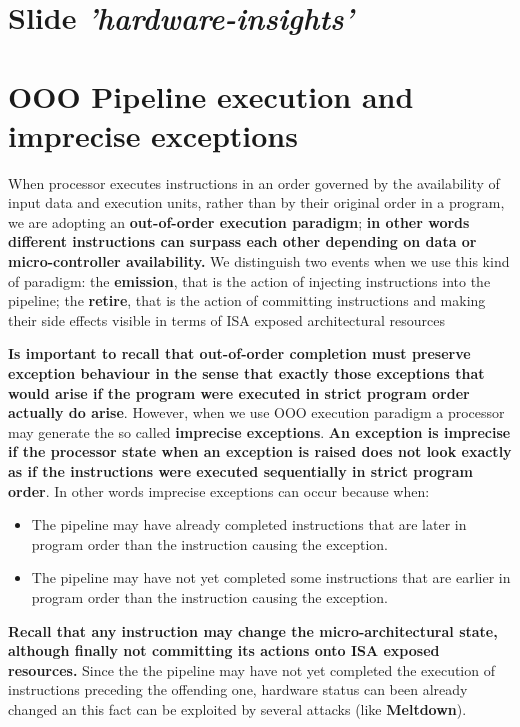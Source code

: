 \documentclass[10pt,a4paper]{article}
\begin{document}
\section{Slide \textit{'hardware-insights'}}

\section{OOO Pipeline execution and imprecise exceptions}

When processor executes instructions in an order governed by the availability of input data and execution units, rather than by their original order in a program, we are adopting an \textbf{out-of-order execution paradigm}; \textbf{in other words different instructions can surpass each other depending on data or micro-controller availability.} We distinguish two events when we use this kind of paradigm: the \textbf{emission}, that is the action of injecting instructions into the pipeline; the \textbf{retire}, that is the action of committing instructions and making their side effects visible in terms of ISA exposed architectural resources

\textbf{Is important to recall that out-of-order completion must preserve exception behaviour in the sense that exactly those exceptions that would arise if the program were executed in strict program order actually do arise}. However, when we use OOO execution paradigm a processor may generate the so called \textbf{imprecise exceptions}. \textbf{An exception is imprecise if the processor state  when  an  exception  is  raised  does  not  look  exactly  as  if  the instructions were executed sequentially in strict program order}. In other words imprecise exceptions can occur because when:

\begin{itemize}
\item The pipeline may have already completed instructions that are later in program order than the instruction causing the exception.
\item The pipeline may have not yet completed some instructions that are earlier in program order than the instruction causing the exception.
\end{itemize}

\textbf{Recall that any instruction may change the micro-architectural state, although finally not committing its actions onto ISA exposed resources.} Since the the pipeline may have not yet completed the execution of instructions preceding the offending one, hardware status can been already changed an this fact can be exploited by several attacks (like \textbf{Meltdown}).
\end{document}
